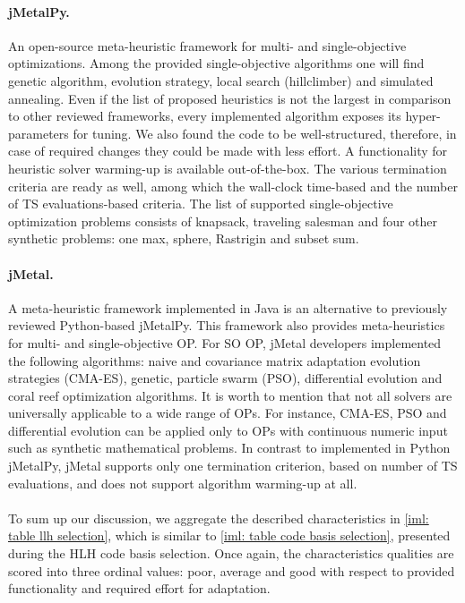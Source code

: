 \paragraph{jMetalPy.} An open-source meta-heuristic framework for multi- and single-objective optimizations. Among the provided single-objective algorithms one will find genetic algorithm, evolution strategy, local search (hillclimber) and simulated annealing. Even if the list of proposed heuristics is not the largest in comparison to other reviewed frameworks, every implemented algorithm exposes its hyper-parameters for tuning. We also found the code to be well-structured, therefore, in case of required changes they could be made with less effort. A functionality for heuristic solver warming-up is available out-of-the-box. The various termination criteria are ready as well, among which the wall-clock time-based and the number of TS evaluations-based criteria. The list of supported single-objective optimization problems consists of knapsack, traveling salesman and four other synthetic problems: one max, sphere, Rastrigin and subset sum.

\paragraph{jMetal.} A meta-heuristic framework implemented in Java is an alternative to previously reviewed Python-based jMetalPy. This framework also provides meta-heuristics for multi- and single-objective OP. For SO OP, jMetal developers implemented the following algorithms: naive and covariance matrix adaptation evolution strategies (CMA-ES), genetic, particle swarm (PSO), differential evolution and coral reef optimization algorithms. It is worth to mention that not all solvers are universally applicable to a wide range of OPs. For instance, CMA-ES, PSO and differential evolution can be applied only to OPs with continuous numeric input such as synthetic mathematical problems. In contrast to implemented in Python jMetalPy, jMetal supports only one termination criterion, based on number of TS evaluations, and does not support algorithm warming-up at all.

\paragraph{} To sum up our discussion, we aggregate the described characteristics in \cref{iml: table llh selection}, which is similar to \cref{iml: table code basis selection}, presented during the HLH code basis selection. Once again, the characteristics qualities are scored into three ordinal values: poor, average and good with respect to provided functionality and required effort for adaptation.

